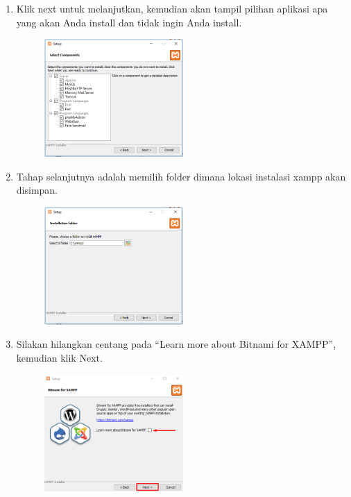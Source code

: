 \begin{enumerate}
	\item Klik next untuk melanjutkan, kemudian akan tampil pilihan aplikasi apa yang akan Anda install dan tidak ingin Anda install.
		\begin{figure}[!htbp]
    		\centering
    		\includegraphics[width=0.5\textwidth]{figures/Xampp4.PNG}
    		\label{Xampp4}
		\end{figure}
		
	\item Tahap selanjutnya adalah memilih folder dimana lokasi instalasi xampp akan disimpan.
		\begin{figure}[!htbp]
    		\centering
    		\includegraphics[width=0.5\textwidth]{figures/Xampp5.PNG}
    		\label{Xampp5}
		\end{figure}
		
	\item Silakan hilangkan centang pada “Learn more about Bitnami for XAMPP”, kemudian klik Next.
		\begin{figure}[!htbp]
    		\centering
    		\includegraphics[width=0.5\textwidth]{figures/Xampp6.png}
    		\label{Xampp6}
		\end{figure}
		

\end{enumerate}
